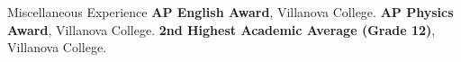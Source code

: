 \begin{rubric}{Miscellaneous Experience}
\entry*[2022] \textbf{AP English Award}, Villanova College.
\entry*[2022] \textbf{AP Physics Award}, Villanova College.
\entry*[2022] \textbf{2nd Highest Academic Average (Grade 12)}, Villanova College.

\end{rubric}
